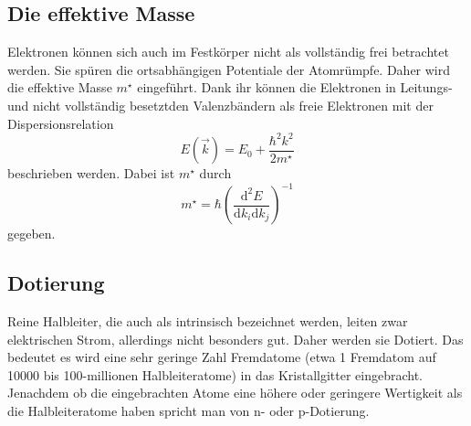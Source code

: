 \subsection{Die effektive Masse}
\label{sec:effektiveMasse}
Elektronen können sich auch im Festkörper nicht als vollständig frei betrachtet werden. Sie spüren die 
ortsabhängigen Potentiale der Atomrümpfe. Daher wird die effektive Masse $m^{\star}$ eingeführt. 
Dank ihr können die Elektronen in Leitungs- und nicht vollständig besetztden Valenzbändern als freie Elektronen
mit der Dispersionsrelation
\begin{equation}
  \label{eq:dispersionsrelation}
  E(\vec{k})=E_0+\frac{\hbar^2k^2}{2m^{\star}}
\end{equation}
beschrieben werden. Dabei ist $m^{\star}$ durch 
\begin{equation*}
  m^{\star}=\hbar(\frac{\mathrm{d}^2E}{\mathrm{d}k_i\mathrm{d}k_j})^{-1}
\end{equation*}
gegeben.


\subsection{Dotierung}
\label{sec:dotierung}
Reine Halbleiter, die auch als intrinsisch bezeichnet werden, leiten zwar elektrischen Strom, allerdings nicht
besonders gut. Daher werden sie Dotiert. Das bedeutet es wird eine sehr geringe Zahl Fremdatome (etwa 1 
Fremdatom auf 10000 bis 100-millionen Halbleiteratome) in das Kristallgitter eingebracht. Jenachdem ob die 
eingebrachten Atome eine höhere oder geringere Wertigkeit als die Halbleiteratome haben spricht man von 
n- oder p-Dotierung.
